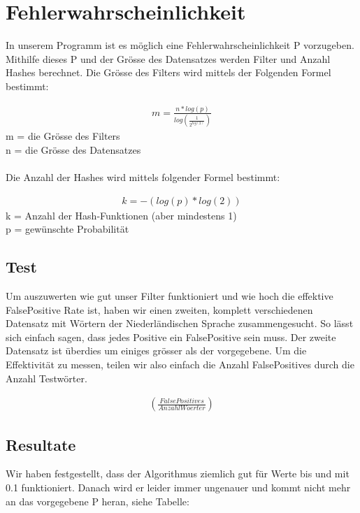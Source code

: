 \documentclass[11pt]{article}
\begin{document}
    \section{Fehlerwahrscheinlichkeit}
    In unserem Programm ist es m{\"o}glich eine Fehlerwahrscheinlichkeit P vorzugeben.
    Mithilfe dieses P und der Gr{\"o}sse des Datensatzes werden Filter und Anzahl Hashes berechnet.
    Die Gr{\"o}sse des Filters wird mittels der Folgenden Formel bestimmt:

     \begin{align*}
        m = \frac{n * log(p)}{log(\frac{1}{2^{log(2)}})}
    \end{align*}
    \smallskip
    m = die Gr{\"o}sse des Filters
    \\
    n = die Gr{\"o}sse des Datensatzes
    \\
    \\
    Die Anzahl der Hashes wird mittels folgender Formel bestimmt:

    \begin{align*}
        k = -(log(p) * log(2))
    \end{align*}
    \smallskip
    k = Anzahl der Hash-Funktionen (aber mindestens 1)
    \\
    p = gew{\"u}nschte Probabilit{\"a}t
    \medskip

    \subsection{Test}
    Um auszuwerten wie gut unser Filter funktioniert und wie hoch die effektive FalsePositive Rate ist,
    haben wir einen zweiten, komplett verschiedenen Datensatz mit W{\"o}rtern der Niederl{\"a}ndischen Sprache zusammengesucht.
    So l{\"a}sst sich einfach sagen, dass jedes Positive ein FalsePositive sein muss. Der zweite Datensatz ist {\"u}berdies um einiges
    gr{\"o}sser als der vorgegebene. Um die Effektivit{\"a}t zu messen, teilen wir also einfach die Anzahl FalsePositives durch die Anzahl
    Testw{\"o}rter.

    \begin{align*}
    (\frac{False Positives}{Anzahl Woerter})
    \end{align*}

    \newpage
    \subsection{Resultate}
    Wir haben festgestellt, dass der Algorithmus ziemlich gut f{\"u}r Werte bis und mit 0.1 funktioniert.
    Danach wird er leider immer ungenauer und kommt nicht mehr an das vorgegebene P heran, siehe Tabelle:
\end{document}
